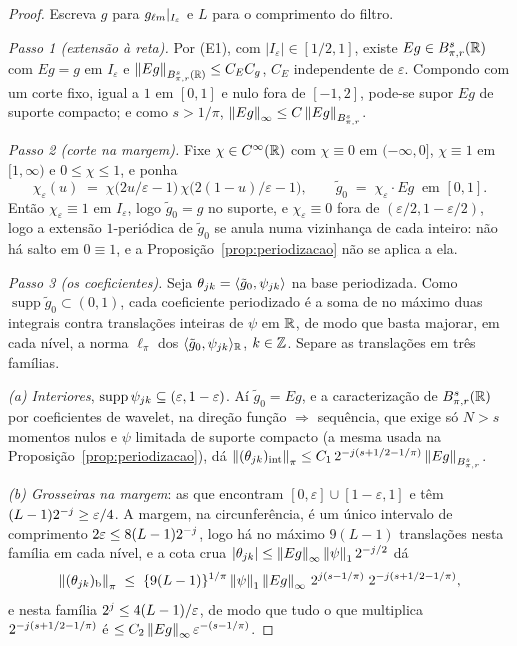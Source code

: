 \documentclass[11pt,a4paper]{article}
\begin{document}
\begin{proof}
Escreva $g$ para $g_{\ell m}|_{I_{\varepsilon}}$ e $L$ para o
comprimento do filtro.

\emph{Passo 1 (extensão à reta).} Por (E1), com $|I_{\varepsilon}| \in
[1/2,1]$, existe $Eg \in B^{s}_{\pi,r}(\mathbb{R})$ com $Eg = g$ em
$I_{\varepsilon}$ e $\left\lVert Eg \right\rVert_{B^{s}_{\pi,r}(\mathbb{R})} \le C_{E}C_{g}$,
$C_{E}$ independente de $\varepsilon$. Compondo com um corte fixo, igual a
$1$ em $[0,1]$ e nulo fora de $[-1,2]$, pode-se supor $Eg$ de suporte
compacto; e como $s > 1/\pi$, $\left\lVert Eg \right\rVert_{\infty} \le C\left\lVert Eg \right\rVert_{B^{s}_{\pi,r}}$.

\emph{Passo 2 (corte na margem).} Fixe $\chi \in C^{\infty}(\mathbb{R})$ com
$\chi \equiv 0$ em $(-\infty,0]$, $\chi \equiv 1$ em $[1,\infty)$ e
$0 \le \chi \le 1$, e ponha
\[
  \chi_{\varepsilon}(u) \;=\;
  \chi\bigl(2u/\varepsilon - 1\bigr)\,
  \chi\bigl(2(1-u)/\varepsilon - 1\bigr),
  \qquad
  \tilde g_{0} \;=\; \chi_{\varepsilon}\cdot Eg \ \text{ em } [0,1].
\]
Então $\chi_{\varepsilon} \equiv 1$ em $I_{\varepsilon}$, logo
$\tilde g_{0} = g$ no suporte, e $\chi_{\varepsilon} \equiv 0$ fora de
$(\varepsilon/2, 1-\varepsilon/2)$, logo a extensão $1$-periódica de
$\tilde g_{0}$ se anula numa vizinhança de cada inteiro: não há salto em
$0 \equiv 1$, e a Proposição~\ref{prop:periodizacao} não se aplica a ela.

\emph{Passo 3 (os coeficientes).} Seja $\theta_{jk} =
\langle \tilde g_{0}, \psi_{jk} \rangle$ na base periodizada. Como
$\operatorname{supp}\tilde g_{0} \subset (0,1)$, cada coeficiente
periodizado é a soma de no máximo duas integrais contra translações
inteiras de $\psi$ em $\mathbb{R}$, de modo que basta majorar, em cada nível, a
norma $\ell_{\pi}$ dos $\langle \tilde g_{0}, \psi_{jk} \rangle_{\mathbb{R}}$,
$k \in \mathbb{Z}$. Separe as translações em três famílias.

\emph{(a) Interiores}, $\operatorname{supp}\psi_{jk} \subseteq
(\varepsilon, 1-\varepsilon)$. Aí $\tilde g_{0} = Eg$, e a caracterização de
$B^{s}_{\pi,r}(\mathbb{R})$ por coeficientes de wavelet, na direção função
$\Rightarrow$ sequência, que exige só $N > s$ momentos nulos e $\psi$
limitada de suporte compacto (a mesma usada na
Proposição~\ref{prop:periodizacao}), dá
$\left\lVert (\theta_{jk})_{\mathrm{int}} \right\rVert_{\pi} \le
C_{1}\,2^{-j(s+1/2-1/\pi)}\left\lVert Eg \right\rVert_{B^{s}_{\pi,r}}$.

\emph{(b) Grosseiras na margem}: as que encontram
$[0,\varepsilon]\cup[1-\varepsilon,1]$ e têm
$(L-1)2^{-j} \ge \varepsilon/4$. A margem, na circunferência, é um único
intervalo de comprimento $2\varepsilon \le 8(L-1)2^{-j}$, logo há no
máximo $9(L-1)$ translações nesta família em cada nível, e a cota crua
$|\theta_{jk}| \le \left\lVert Eg \right\rVert_{\infty}\left\lVert \psi \right\rVert_{1}2^{-j/2}$ dá
\[
  \left\lVert (\theta_{jk})_{\mathrm{b}} \right\rVert_{\pi}
  \;\le\; \{9(L-1)\}^{1/\pi}\left\lVert \psi \right\rVert_{1}\left\lVert Eg \right\rVert_{\infty}\,
  2^{j(s-1/\pi)}\;2^{-j(s+1/2-1/\pi)} ,
\]
e nesta família $2^{j} \le 4(L-1)/\varepsilon$, de modo que tudo o que
multiplica $2^{-j(s+1/2-1/\pi)}$ é
$\le C_{2}\left\lVert Eg \right\rVert_{\infty}\varepsilon^{-(s-1/\pi)}$.


\end{proof}
\end{document}
